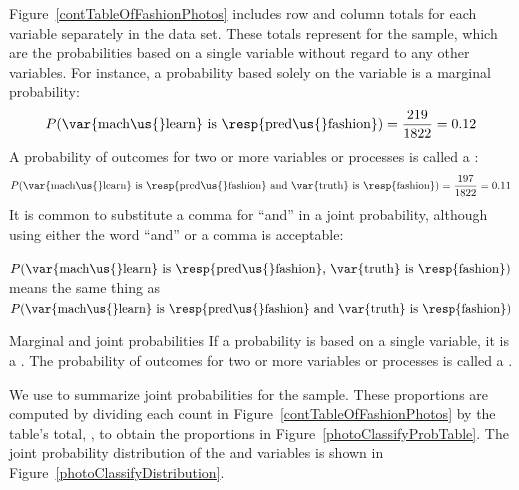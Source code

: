 Figure~\ref{contTableOfFashionPhotos} includes row and
column totals for each variable separately in the
 data set.
These totals represent
for the sample, which are the probabilities based on a
single variable without regard to any other variables.
For instance, a probability based solely on the
 variable is a marginal probability:
\begin{align*}
P(\text{\var{mach\us{}learn} is \resp{pred\us{}fashion}})
    = \frac{\fashYA{}}{\fashN{}}
    = 0.12
\end{align*}
A probability of outcomes for two or more variables
or processes is called a
:
\begin{align*}
P(\text{\var{mach\us{}learn} is \resp{pred\us{}fashion}
    and \var{truth} is \resp{fashion}})
  = \frac{\fashYY{}}{\fashN{}}
  = 0.11
\end{align*}
It is common to substitute a comma for ``and'' in a joint
probability, although using either the word ``and'' or a
comma is acceptable:
\begin{center}
$P(\text{\var{mach\us{}learn} is \resp{pred\us{}fashion},
    \var{truth} is \resp{fashion}})$ \\[2mm]
means the same thing as \\[2mm]
$P(\text{\var{mach\us{}learn} is \resp{pred\us{}fashion}
    and \var{truth} is \resp{fashion}})$
\end{center}

\begin{onebox}{Marginal and joint probabilities}
  If a probability is based on a single variable,
  it is a \emph{}.
  The probability of outcomes for two or more variables
  or processes is called a \emph{}.
\end{onebox}

We use  to summarize joint probabilities
for the  sample.
These proportions are computed by dividing each count in
Figure~\ref{contTableOfFashionPhotos} by the table's total,
\fashN{}, to obtain the proportions in
Figure~\ref{photoClassifyProbTable}.
The joint probability distribution of the 
and  variables is shown in
Figure~\ref{photoClassifyDistribution}.

